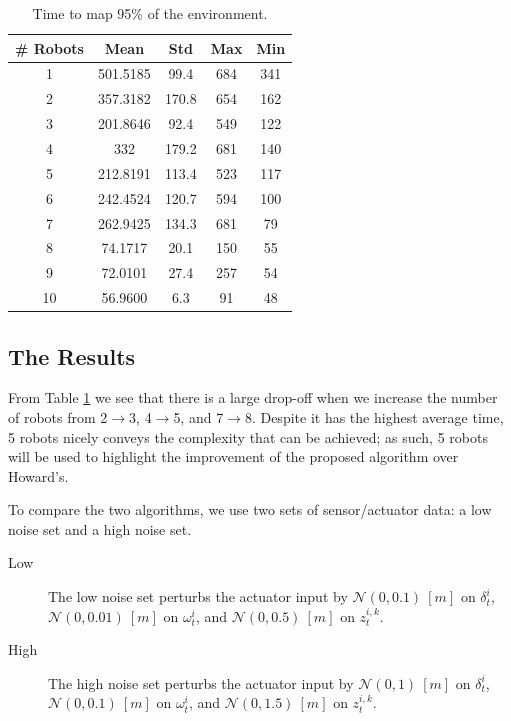 \begin{table}
\centering
\caption{Time to map 95\% of the environment.}
\label{table:timing}
\begin{tabular}{c|c|c|c|c}
\hline
\hline
\# Robots & Mean & Std  & Max & Min \\
\hline
1 &  501.5185  &  99.4  & 684  & 341\\
\hline
2 &  357.3182  & 170.8  & 654  & 162\\
\hline
3 & 201.8646   & 92.4  & 549  & 122\\
\hline
4 &  332  & 179.2 & 681  & 140\\
\hline
5 &  212.8191  & 113.4  & 523  & 117\\
\hline
6  & 242.4524  & 120.7  & 594  & 100\\
\hline
7  & 262.9425  & 134.3  & 681  &  79\\
\hline
8  &  74.1717  &  20.1 &  150  & 55\\
\hline
9  &  72.0101  &  27.4  & 257   & 54\\
\hline
10  &  56.9600  &   6.3  &  91  &  48\\
\hline
\hline
\end{tabular}
\end{table}



\subsection{The Results}
\label{S:Exp:Results}

From Table \ref{table:timing} we see that there is a large drop-off when we increase the number of robots from 2$\rightarrow$3, 4$\rightarrow$5, and 7$\rightarrow$8.  Despite it has the highest average time, 5 robots nicely conveys the complexity that can be achieved; as such, 5 robots will be used to highlight the improvement of the proposed algorithm over Howard's.  

To compare the two algorithms, we use two sets of sensor/actuator data: a low noise set and a high noise set. 
\begin{description}
\item[Low] The low noise set perturbs the actuator input by $\mathcal{N}(0,0.1)\ [m]$ on $\delta_t^{i}$, $\mathcal{N}(0,0.01)\ [m]$ on $\omega_t^{i}$, and $\mathcal{N}(0,0.5)\ [m]$ on $z_t^{i,k}$.  
\item[High] The high noise set perturbs the actuator input by $\mathcal{N}(0,1)\ [m]$ on $\delta_t^{i}$, $\mathcal{N}(0,0.1)\ [m]$ on $\omega_t^{i}$, and $\mathcal{N}(0,1.5)\ [m]$ on $z_t^{i,k}$.
\end{description}


